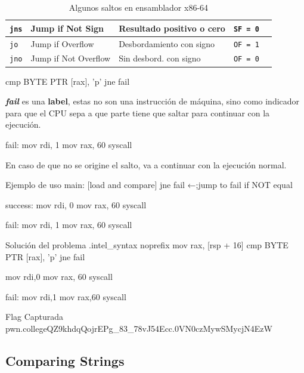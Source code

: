 \begin{table}[htpb]
\begin{tabular}{|l|l|l|l|l|}
		\texttt{jns}                & Jump if Not Sign                 & Resultado positivo o cero      & \texttt{SF = 0}                         \\ \hline
		\texttt{jo}                 & Jump if Overflow                 & Desbordamiento con signo       & \texttt{OF = 1}                         \\ \hline
		\texttt{jno}                & Jump if Not Overflow             & Sin desbord. con signo         & \texttt{OF = 0}                         \\ \hline
	\end{tabular}
	\caption{ Algunos saltos en ensamblador x86-64}
	\label{tab:saltos_asm}
\end{table}

\begin{codebox}[ASM]{}
	cmp BYTE PTR [rax], 'p'
	jne fail
\end{codebox}

\textbf{\textit{fail}} es una \textbf{label}, estas no son una instrucción de máquina, sino como indicador para que el CPU
sepa a que parte tiene que saltar para continuar con la ejecución.

\begin{codebox}[ASM]{}
	fail:
	mov rdi, 1
	mov rax, 60
	syscall
\end{codebox}

En caso de que no se origine el salto, va a continuar con la ejecución normal.

\begin{codebox}[ASM]{Ejemplo de uso}
	main:
	[load and compare]
	jne fail          ←;jump to fail if NOT equal

	success:
	mov rdi, 0
	mov rax, 60
	syscall

	fail:
	mov rdi, 1
	mov rax, 60
	syscall
\end{codebox}

\begin{codebox}[ASM]{Solución del problema}
	.intel_syntax noprefix
	mov rax, [rsp + 16]
	cmp BYTE PTR [rax], 'p'
	jne fail

	mov rdi,0
	mov rax, 60
	syscall

	fail:
	mov rdi,1
	mov rax,60
	syscall
\end{codebox}

\begin{flagbox}{Flag Capturada}
	pwn.college{QZ9khdqQojrEPg_83_78vJ54Ecc.0VN0czMywSMycjN4EzW}
\end{flagbox}


\subsection{Comparing  Strings} \label{subsec:comparing_strings}

